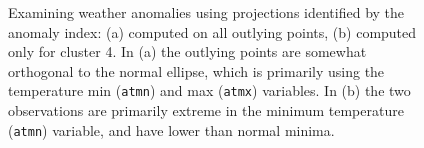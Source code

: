 \documentclass[
  12pt,
]{interact}
\begin{document}
\begin{figure}

\begin{minipage}{0.50\linewidth}



\end{minipage}%
%
\begin{minipage}{0.50\linewidth}



\end{minipage}%

\caption{\label{fig-weather}Examining weather anomalies using
projections identified by the anomaly index: (a) computed on all
outlying points, (b) computed only for cluster 4. In (a) the outlying
points are somewhat orthogonal to the normal ellipse, which is primarily
using the temperature min (\texttt{atmn}) and max (\texttt{atmx})
variables. In (b) the two observations are primarily extreme in the
minimum temperature (\texttt{atmn}) variable, and have lower than normal
minima.}

\end{figure}%
\end{document}
